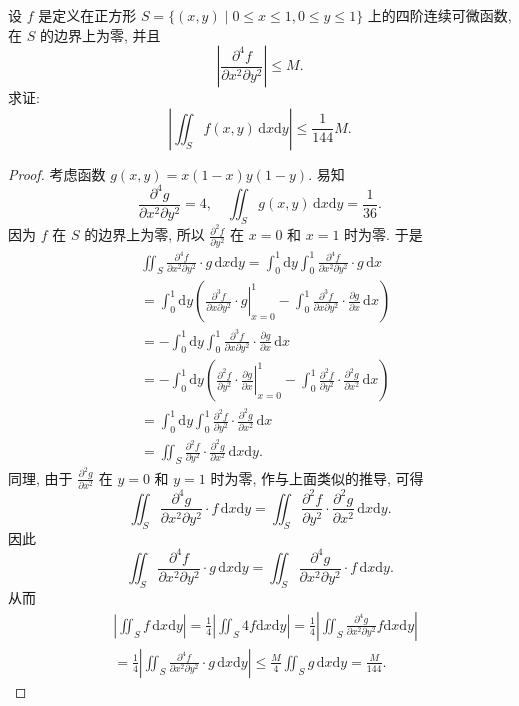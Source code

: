 \documentclass[../../main.tex]{subfiles}
\begin{document}
\begin{example}
设 \( f \) 是定义在正方形 \( S = \{ (x,y) \mid 0 \leqslant x \leqslant 1, 0 \leqslant y \leqslant 1 \} \) 上的四阶连续可微函数, 在 \( S \) 的边界上为零, 并且
\[
\left| \frac{\partial^4 f}{\partial x^2 \partial y^2} \right| \leqslant M.
\]
求证: 
\[
\left| \iint_S f(x,y) \, \mathrm{d}x\mathrm{d}y \right| \leqslant \frac{1}{144} M.
\]
\end{example}
\begin{proof}
考虑函数 \( g(x,y) = x(1 - x)y(1 - y) \). 易知
\[
\frac{\partial^4 g}{\partial x^2 \partial y^2} = 4, \quad \iint_S g(x,y) \, \mathrm{d}x\mathrm{d}y = \frac{1}{36}.
\]
因为 \( f \) 在 \( S \) 的边界上为零, 所以 \( \frac{\partial^2 f}{\partial y^2} \) 在 \( x = 0 \) 和 \( x = 1 \) 时为零. 于是
\begin{align*}
&\iint_S{\frac{\partial ^4f}{\partial x^2\partial y^2}}\cdot g\,\mathrm{d}x\mathrm{d}y=\int_0^1{\mathrm{d}y\int_0^1{\frac{\partial ^4f}{\partial x^2\partial y^2}}}\cdot g\,\mathrm{d}x
\\
&=\int_0^1{\mathrm{d}y\left( \left. \frac{\partial ^3f}{\partial x\partial y^2}\cdot g \right|_{x=0}^{1}-\int_0^1{\frac{\partial ^3f}{\partial x\partial y^2}}\cdot \frac{\partial g}{\partial x}\,\mathrm{d}x \right)}
\\
&=-\int_0^1{\mathrm{d}y\int_0^1{\frac{\partial ^3f}{\partial x\partial y^2}}}\cdot \frac{\partial g}{\partial x}\,\mathrm{d}x
\\
&=-\int_0^1{\mathrm{d}y\left( \left. \frac{\partial ^2f}{\partial y^2}\cdot \frac{\partial g}{\partial x} \right|_{x=0}^{1}-\int_0^1{\frac{\partial ^2f}{\partial y^2}}\cdot \frac{\partial ^2g}{\partial x^2}\,\mathrm{d}x \right)}
\\
&=\int_0^1{\mathrm{d}y\int_0^1{\frac{\partial ^2f}{\partial y^2}}}\cdot \frac{\partial ^2g}{\partial x^2}\,\mathrm{d}x
\\
&=\iint_S{\frac{\partial ^2f}{\partial y^2}}\cdot \frac{\partial ^2g}{\partial x^2}\,\mathrm{d}x\mathrm{d}y.
\end{align*}
同理, 由于 \( \frac{\partial^2 g}{\partial x^2} \) 在 \( y = 0 \) 和 \( y = 1 \) 时为零, 作与上面类似的推导, 可得
\[
\iint_S \frac{\partial^4 g}{\partial x^2 \partial y^2} \cdot f \, \mathrm{d}x\mathrm{d}y = \iint_S \frac{\partial^2 f}{\partial y^2} \cdot \frac{\partial^2 g}{\partial x^2} \, \mathrm{d}x\mathrm{d}y.
\]
因此
\[
\iint_S \frac{\partial^4 f}{\partial x^2 \partial y^2} \cdot g \, \mathrm{d}x\mathrm{d}y = \iint_S \frac{\partial^4 g}{\partial x^2 \partial y^2} \cdot f \, \mathrm{d}x\mathrm{d}y.
\]
从而
\begin{align*}
&\left| \iint_S{f\,\mathrm{d}x\mathrm{d}y} \right|=\frac{1}{4}\left| \iint_S{4f\mathrm{d}x\mathrm{d}y} \right|=\frac{1}{4}\left| \iint_S{\frac{\partial ^4g}{\partial x^2\partial y^2}f\mathrm{d}x\mathrm{d}y} \right|
\\
&=\frac{1}{4}\left| \iint_S{\frac{\partial ^4f}{\partial x^2\partial y^2}\cdot g\,\mathrm{d}x\mathrm{d}y} \right|\leqslant \frac{M}{4}\iint_S{g\,\mathrm{d}x\mathrm{d}y}=\frac{M}{144}.
\end{align*}
\end{proof}
\end{document}
